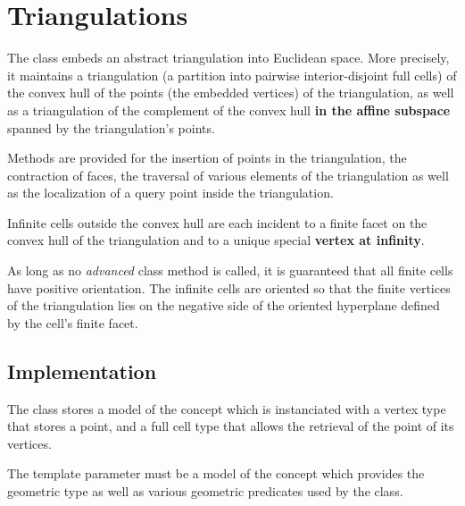 
\section{Triangulations}

The class  embeds an abstract 
triangulation into Euclidean space. More precisely, it
maintains a triangulation (a partition into pairwise interior-disjoint full
cells) of the convex hull of the points (the embedded vertices) of the
triangulation, as well as a triangulation of the complement of the convex hull
\textbf{in the affine subspace} spanned by the triangulation's points.

Methods are provided for the insertion of points in the triangulation, the
contraction of faces, the traversal of various elements of the triangulation
as well as the localization of a query point inside the triangulation.

Infinite cells outside the convex hull are each incident to
a finite facet on the convex hull of the triangulation and to a unique special
\textbf{vertex at infinity}. 

As long as no \emph{advanced} class method is called, it is guaranteed that
all finite cells have positive orientation. The infinite cells are
oriented so that the finite vertices of the triangulation lies on the negative side of
the oriented hyperplane defined by the cell's finite facet.



\subsection{Implementation}

The class  stores a model 
of the concept  which is instanciated with a
vertex type that stores a point, and a full cell type that allows the retrieval
of the point of its vertices.

The template parameter  must be a model of the concept
 which provides the geometric  type as well
as various geometric predicates used by the  class.

